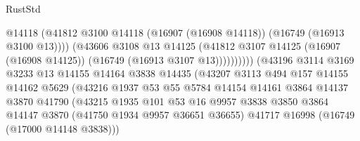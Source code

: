 \begin{lexlean}{RustStd}
\begin{coremodule}
                                            @14118
                                            (@41812
                                              @3100
                                              @14118
                                              (@16907 (@16908 @14118))
                                              (@16749 (@16913 @3100 @13))))
                                          (@43606
                                            @3108
                                            @13
                                            @14125
                                            (@41812
                                              @3107
                                              @14125
                                              (@16907 (@16908 @14125))
                                              (@16749 (@16913 @3107 @13))))))))))
                              (@43196
                                @3114
                                @3169
                                @3233
                                @13
                                @14155
                                @14164
                                @3838
                                @14435
                                (@43207
                                  @3113
                                  @494
                                  @157
                                  @14155
                                  @14162
                                  @5629
                                  (@43216
                                    @1937
                                    @53
                                    @55
                                    @5784
                                    @14154
                                    @14161
                                    @3864
                                    @14137
                                    @3870
                                    @41790
                                    (@43215
                                      @1935
                                      @101
                                      @53
                                      @16
                                      @9957
                                      @3838
                                      @3850
                                      @3864
                                      @14147
                                      @3870
                                      (@41750 @1934 @9957 @36651 @36655)
                                      @41717
                                      @16998
                                      (@16749 (@17000 @14148 @3838)))

\end{coremodule}
\end{lexlean}
